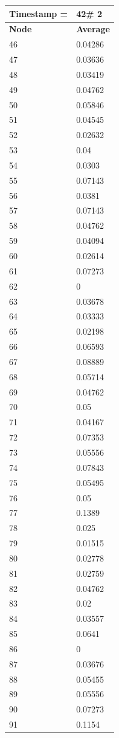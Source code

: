\begin{tabular}{|l||l|}
\hline
\textbf{Timestamp =} & \textbf{42}\# 2\\\hline
	\textbf{Node} & \textbf{Average} \\ \hline
\hline
	46 & 0.04286 \\ \hline
	47 & 0.03636 \\ \hline
	48 & 0.03419 \\ \hline
	49 & 0.04762 \\ \hline
	50 & 0.05846 \\ \hline
	51 & 0.04545 \\ \hline
	52 & 0.02632 \\ \hline
	53 & 0.04 \\ \hline
	54 & 0.0303 \\ \hline
	55 & 0.07143 \\ \hline
	56 & 0.0381 \\ \hline
	57 & 0.07143 \\ \hline
	58 & 0.04762 \\ \hline
	59 & 0.04094 \\ \hline
	60 & 0.02614 \\ \hline
	61 & 0.07273 \\ \hline
	62 & 0 \\ \hline
	63 & 0.03678 \\ \hline
	64 & 0.03333 \\ \hline
	65 & 0.02198 \\ \hline
	66 & 0.06593 \\ \hline
	67 & 0.08889 \\ \hline
	68 & 0.05714 \\ \hline
	69 & 0.04762 \\ \hline
	70 & 0.05 \\ \hline
	71 & 0.04167 \\ \hline
	72 & 0.07353 \\ \hline
	73 & 0.05556 \\ \hline
	74 & 0.07843 \\ \hline
	75 & 0.05495 \\ \hline
	76 & 0.05 \\ \hline
	77 & 0.1389 \\ \hline
	78 & 0.025 \\ \hline
	79 & 0.01515 \\ \hline
	80 & 0.02778 \\ \hline
	81 & 0.02759 \\ \hline
	82 & 0.04762 \\ \hline
	83 & 0.02 \\ \hline
	84 & 0.03557 \\ \hline
	85 & 0.0641 \\ \hline
	86 & 0 \\ \hline
	87 & 0.03676 \\ \hline
	88 & 0.05455 \\ \hline
	89 & 0.05556 \\ \hline
	90 & 0.07273 \\ \hline
	91 & 0.1154 \\ \hline
\end{tabular}
